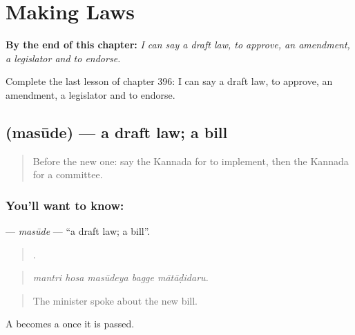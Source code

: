 
\chapter{Making Laws}
\label{ch:ka-making-laws}

\begin{chapteropening}
\textbf{By the end of this chapter:} \emph{I can say a draft law, to approve, an amendment, a legislator and to endorse.}

Complete the last lesson of chapter 396: I can say a draft law, to approve, an amendment, a legislator and to endorse.
\end{chapteropening}

\section[\texorpdfstring{\kn{ಮಸೂದೆ} (masūde)}{ಮಸೂದೆ (masūde)}]{ (masūde) — a draft law; a bill}

\label{lesson:KA-C396-masude}



\begin{quote}
Before the new one: say the Kannada for to implement, then the Kannada for a committee.
\end{quote}

\subsection*{You'll want to know: }
\textbf{} — \emph{masūde} — \textquotedblleft{}a draft law; a bill\textquotedblright{}.

\begin{quote}
    .
\end{quote}

\begin{quote}
\emph{mantri hosa masūdeya bagge mātāḍidaru.}
\end{quote}

\begin{quote}
The minister spoke about the new bill.
\end{quote}

A  becomes a  once it is passed.

